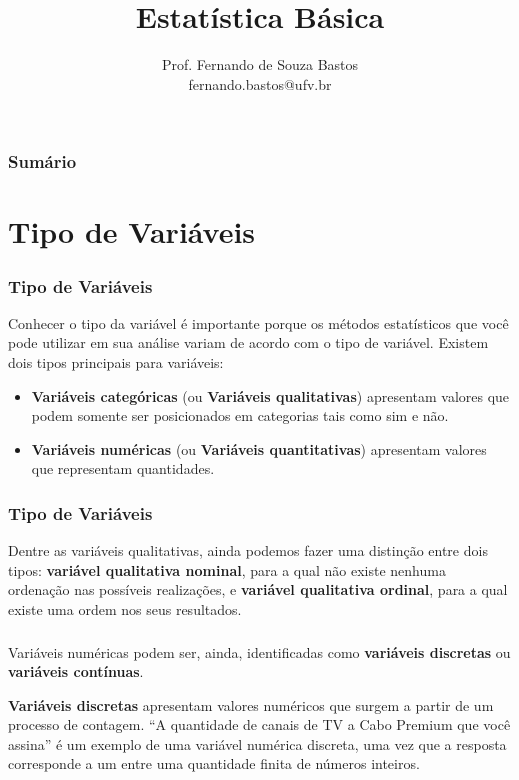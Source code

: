 \documentclass[12pt]{beamer}
\title{Estatística Básica}
\author{Prof. Fernando de Souza Bastos\texorpdfstring{\\ fernando.bastos@ufv.br}{}}
\institute{Instituto de Ciências Exatas e Tecnológicas\texorpdfstring{\\ Universidade Federal de Viçosa}{}\texorpdfstring{\\ Campus UFV - Florestal}{}}
\date{}
\begin{document}

\frame{\titlepage}

\begin{frame}{}
\frametitle{\bf Sumário}
\tableofcontents
\end{frame}

\section{Tipo de Variáveis}
\begin{frame}{}
\frametitle{Tipo de Variáveis}
\begin{block}{}
\justifying
Conhecer o tipo da variável é importante porque os métodos estatísticos que você pode utilizar em sua análise variam de acordo com o tipo de variável. Existem dois 
tipos principais para variáveis:
\begin{itemize}
\item {\bf Variáveis categóricas} (ou {\bf Variáveis qualitativas}) apresentam valores que podem somente ser posicionados em categorias tais como sim e não. \pause
\item {\bf Variáveis numéricas} (ou {\bf Variáveis quantitativas}) apresentam valores que representam quantidades.
\end{itemize}
\end{block}
\end{frame}

\begin{frame}{}
\frametitle{Tipo de Variáveis}
\begin{block}{}
\justifying
Dentre as variáveis qualitativas, ainda podemos fazer uma distinção entre dois tipos: \textbf{variável qualitativa nominal}, para a qual não existe nenhuma ordenação nas
possíveis realizações, e \textbf{variável qualitativa ordinal}, para a qual existe uma ordem nos seus resultados.
\end{block}
\end{frame}

\begin{frame}{}
\frametitle{}
\begin{block}{}
\justifying
Variáveis numéricas podem ser, ainda, identificadas como \textbf{variáveis discretas} ou \textbf{variáveis contínuas}.
\end{block}
\pause
\begin{block}{}
\justifying
\textbf{Variáveis discretas} apresentam valores numéricos que surgem a partir de um processo de contagem. ``A quantidade de canais de TV a Cabo Premium que você 
assina'' é um exemplo de uma variável numérica discreta, uma vez que a resposta corresponde a um entre uma quantidade finita de números inteiros.
\end{block}
\end{frame}
\end{document}
